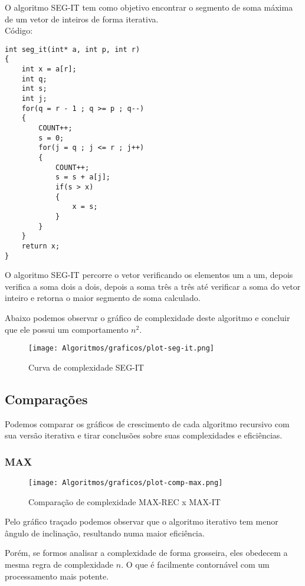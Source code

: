 \documentclass[a4paper, 12pt]{article}
\begin{document}
O algoritmo SEG-IT tem como objetivo encontrar o segmento de soma máxima de um vetor de inteiros de forma iterativa.\\


Código:

\begin{lstlisting}
int seg_it(int* a, int p, int r)
{
	int x = a[r];	
	int q;
	int s;
	int j;
	for(q = r - 1 ; q >= p ; q--)	
	{
		COUNT++;
		s = 0;
		for(j = q ; j <= r ; j++)
		{
			COUNT++;
			s = s + a[j];
			if(s > x)				
			{
				x = s;	
			}
		}
	}
	return x;
}
\end{lstlisting}

O algoritmo SEG-IT percorre o vetor verificando os elementos um a um, depois verifica a soma dois a dois, depois a soma três a três até verificar a soma do vetor inteiro e retorna o maior segmento de soma calculado.  

Abaixo podemos observar o gráfico de complexidade deste algoritmo e concluir que ele possui um comportamento $n^2$.

\begin{figure}[h]
	\centering
	\texttt{[image: Algoritmos/graficos/plot-seg-it.png]}
	\caption{Curva de complexidade SEG-IT}
	\label{fig:seg-it}
\end{figure}

\newpage

\subsection{Comparações}

Podemos comparar os gráficos de crescimento de cada algoritmo recursivo com sua versão iterativa e tirar conclusões sobre suas complexidades e eficiências.

\newpage

\subsubsection{MAX}

\begin{figure}[h]
	\centering
	\texttt{[image: Algoritmos/graficos/plot-comp-max.png]}
	\caption{Comparação de complexidade MAX-REC x MAX-IT}
	\label{fig:max}
\end{figure}

Pelo gráfico traçado podemos observar que o algoritmo iterativo tem menor ângulo de inclinação, resultando numa maior eficiência.

Porém, se formos analisar a complexidade de forma grosseira, eles obedecem a mesma regra de complexidade $n$. O que é facilmente contornável com um processamento mais potente.
\end{document}
